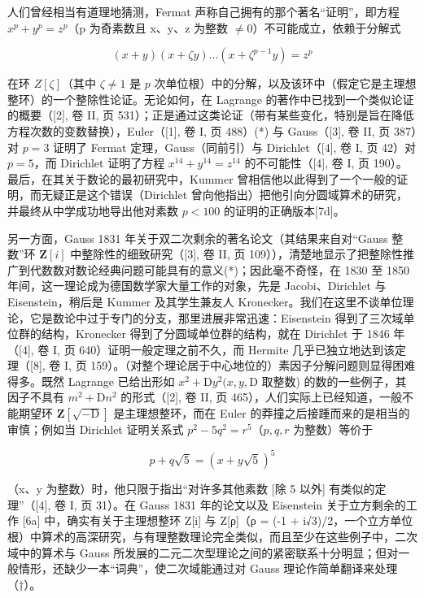 人们曾经相当有道理地猜测，Fermat 声称自己拥有的那个著名“证明”，即方程 \(x^{p} + y^{p} = z^{p}\)（p 为奇素数且 x、y、z 为整数 \(\neq 0\)）不可能成立，依赖于分解式

\[
(x + y) (x + \zeta y) \dots (x + \zeta^ {p - 1} y) = z ^ {p}
\]

在环 \(Z[\zeta]\)（其中 \(\zeta \neq 1\) 是 \(p\) 次单位根）中的分解，以及该环中（假定它是主理想整环）的一个整除性论证。无论如何，在 Lagrange 的著作中已找到一个类似论证的概要（{[}2{]}, 卷 II, 页 531）；正是通过这类论证（带有某些变化，特别是旨在降低方程次数的变数替换），Euler（{[}1{]}, 卷 I, 页 488）(*) 与 Gauss（{[}3{]}, 卷 II, 页 387）对 \(p = 3\) 证明了 Fermat 定理，Gauss（同前引）与 Dirichlet（{[}4{]}, 卷 I, 页 42）对 \(p = 5\)，而 Dirichlet 证明了方程 \(x^{14} + y^{14} = z^{14}\) 的不可能性（{[}4{]}, 卷 I, 页 190）。最后，在其关于数论的最初研究中，Kummer 曾相信他以此得到了一个一般的证明，而无疑正是这个错误（Dirichlet 曾向他指出）把他引向分圆域算术的研究，并最终从中学成功地导出他对素数 \(p < 100\) 的证明的正确版本{[}7d{]}。

另一方面，Gauss 1831 年关于双二次剩余的著名论文（其结果来自对“Gauss 整数”环 \(\mathbf{Z}[i]\) 中整除性的细致研究（{[}3{]}, 卷 II, 页 109）），清楚地显示了把整除性推广到代数数对数论经典问题可能具有的意义(*)；因此毫不奇怪，在 1830 至 1850 年间，这一理论成为德国数学家大量工作的对象，先是 Jacobi、Dirichlet 与 Eisenstein，稍后是 Kummer 及其学生兼友人 Kronecker。我们在这里不谈单位理论，它是数论中过于专门的分支，那里进展非常迅速：Eisenstein 得到了三次域单位群的结构，Kronecker 得到了分圆域单位群的结构，就在 Dirichlet 于 1846 年（{[}4{]}, 卷 I, 页 640）证明一般定理之前不久，而 Hermite 几乎已独立地达到该定理（{[}8{]}, 卷 I, 页 159）。（对整个理论居于中心地位的）素因子分解问题则显得困难得多。既然 Lagrange 已给出形如 \(x^{2} + \mathrm{D}y^{2}(x,y,\mathrm{D}\) 取整数) 的数的一些例子，其因子不具有 \(m^2 +\mathrm{D}n^2\) 的形式（{[}2{]}, 卷 II, 页 465），人们实际上已经知道，一般不能期望环 \(\mathbf{Z}[\sqrt{-\mathrm{D}} ]\) 是主理想整环，而在 Euler 的莽撞之后接踵而来的是相当的审慎；例如当 Dirichlet 证明关系式 \(p^2 -5q^2 = r^5\)（\(p,q,r\) 为整数）等价于

\[
p + q \sqrt {5} = (x + y \sqrt {5}) ^ {5}
\]

（x、y 为整数）时，他只限于指出“对许多其他素数 {[}除 5 以外{]} 有类似的定理”（{[}4{]}, 卷 I, 页 31）。在 Gauss 1831 年的论文以及 Eisenstein 关于立方剩余的工作 {[}6a{]} 中，确实有关于主理想整环 Z{[}i{]} 与 Z{[}ρ{]}（ρ = (-1 + i√3)/2，一个立方单位根）中算术的高深研究，与有理整数理论完全类似，而且至少在这些例子中，二次域中的算术与 Gauss 所发展的二元二次型理论之间的紧密联系十分明显；但对一般情形，还缺少一本“词典”，使二次域能通过对 Gauss 理论作简单翻译来处理（†）。

